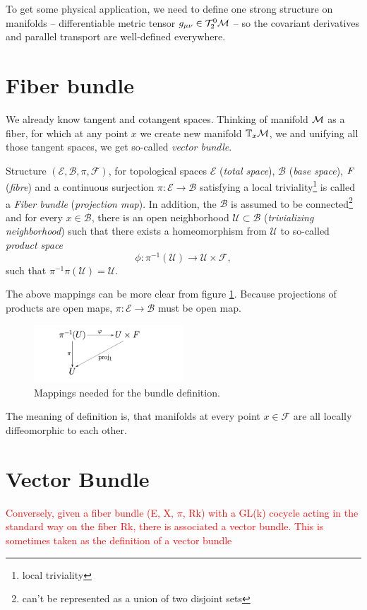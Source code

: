 To get some physical application, we need to define one strong structure on manifolds -- differentiable metric tensor $g_{\mu\nu}\in\mathcal{T}^0_2\mathcal{M}$ -- so the covariant derivatives and parallel transport are well-defined everywhere. 


\section{Fiber bundle}
\label{sec:bundleDef}
We already know tangent and cotangent spaces. Thinking of manifold $\mathcal{M}$ as a fiber, for which at any point $x$ we create new manifold $\mathbb{T}_x\mathcal{M}$, we and unifying all those tangent spaces, we get so-called \emph{vector bundle}. 
\begin{definition}
    Structure $(\mathcal{E},\mathcal{B},\pi,\mathcal{F})$, for topological spaces $\mathcal{E}$ (\emph{total space}), $\mathcal{B}$ (\emph{base space}), $\emph{F}$ (\emph{fibre}) and a continuous surjection $\pi: \mathcal{E}\rightarrow \mathcal{B}$ satisfying a local triviality\footnote{local triviality} is called a \emph{Fiber bundle} (\emph{projection map}). In addition, the $\mathcal{B}$ is assumed to be connected\footnote{can't be represented as a union of two disjoint sets} and for every $x\in \mathcal{B}$, there is an open neighborhood $\mathcal{U}\subset \mathcal{B}$ (\emph{trivializing neighborhood}) such that there exists a homeomorphism from $\mathcal{U}$ to so-called \emph{product space}
    $$\phi: \pi^{-1}(\mathcal{U})\rightarrow \mathcal{U}\times \mathcal{F},$$
    such that $\pi^{-1}\pi(\mathcal{U})=\mathcal{U}$.
\end{definition}

The above mappings can be more clear from figure \ref{fig:bundle}. Because projections of products are open maps, $\pi: \mathcal{E}\rightarrow \mathcal{B}$ must be open map.
\begin{figure}[h]
    \centering
    \includegraphics[width=0.5\textwidth]{../img/bundle.png}
    \caption{Mappings needed for the bundle definition.}
    \label{fig:bundle}    
\end{figure}
The meaning of definition is, that manifolds at every point $x\in \mathcal{F}$ are all locally diffeomorphic to each other.
\section{Vector Bundle}
\textcolor{red}{Conversely, given a fiber bundle (E, X, $\pi$, Rk) with a GL(k) cocycle acting in the standard way on the fiber Rk, there is associated a vector bundle. This is sometimes taken as the definition of a vector bundle}


